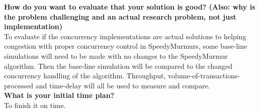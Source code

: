 \documentclass{article}
\begin{document}
\textbf{How do you want to evaluate that your solution is good? (Also: why is the problem challenging and an actual research problem, not just implementation)} \\

To evaluate if the concurrency implementations are actual solutions to helping congestion with proper concurrency control in SpeedyMurmurs, some base-line simulations will need to be made with no changes to the SpeedyMurmur algorithm. Then the base-line simulation will be compared to the changed concurrency handling of the algorithm. Throughput, volume-of-transactions-processed and time-delay will all be used to measure and compare.\\



\textbf{What is your initial time plan?} \\

To finish it on time.

\pagebreak



\end{document}
